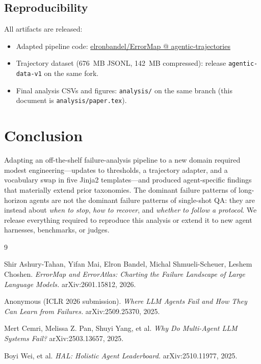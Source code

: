 \documentclass[11pt]{article}
\begin{document}
\subsection{Reproducibility}

All artifacts are released:
\begin{itemize}
\item Adapted pipeline code:
\href{https://github.com/elronbandel/ErrorMap/tree/agentic-trajectories}{elronbandel/ErrorMap @ agentic-trajectories}
\item Trajectory dataset (676~MB JSONL, 142~MB compressed):
release \texttt{agentic-data-v1} on the same fork.
\item Final analysis CSVs and figures: \texttt{analysis/} on the
same branch (this document is \texttt{analysis/paper.tex}).
\end{itemize}

\section{Conclusion}

Adapting an off-the-shelf failure-analysis pipeline to a new domain
required modest engineering---updates to thresholds, a trajectory
adapter, and a vocabulary swap in five Jinja2 templates---and
produced agent-specific findings that materially extend prior
taxonomies. The dominant failure patterns of long-horizon agents are
not the dominant failure patterns of single-shot QA: they are
instead about \emph{when to stop}, \emph{how to recover}, and
\emph{whether to follow a protocol}. We release everything required
to reproduce this analysis or extend it to new agent harnesses,
benchmarks, or judges.


\begin{thebibliography}{9}

Shir Ashury-Tahan, Yifan Mai, Elron Bandel, Michal Shmueli-Scheuer,
Leshem Choshen.
\emph{ErrorMap and ErrorAtlas: Charting the Failure Landscape of
Large Language Models.}
arXiv:2601.15812, 2026.

Anonymous (ICLR 2026 submission).
\emph{Where LLM Agents Fail and How They Can Learn from Failures.}
arXiv:2509.25370, 2025.

Mert Cemri, Melissa Z. Pan, Shuyi Yang, et al.
\emph{Why Do Multi-Agent LLM Systems Fail?}
arXiv:2503.13657, 2025.

Boyi Wei, et al.
\emph{HAL: Holistic Agent Leaderboard.}
arXiv:2510.11977, 2025.

\end{thebibliography}
\end{document}
